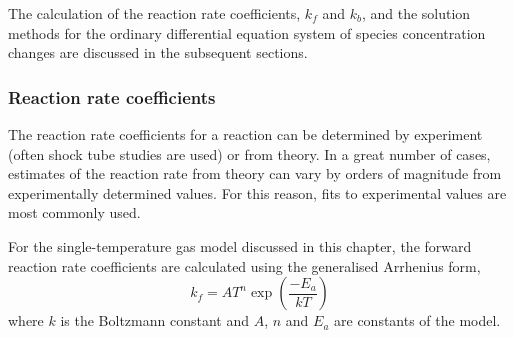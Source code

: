 \medskip
The calculation of the reaction rate coefficients, $k_f$ and $k_b$, and the solution methods for the ordinary differential
equation system of species concentration changes are discussed in the subsequent sections.

\subsubsection{Reaction rate coefficients}
%
The reaction rate coefficients for a reaction can be determined by experiment (often
shock tube studies are used) or from theory.
In a great number of cases, estimates of the reaction rate from theory can vary by
orders of magnitude from experimentally determined values.
For this reason, fits to experimental values are most commonly used.

For the single-temperature gas model discussed in this chapter,
the forward reaction rate coefficients are calculated using
the generalised Arrhenius form,
\begin{equation}
\label{eqn:ga}
k_f = A T^{n} \exp{\left( \frac{-E_a}{kT}\right)}
\end{equation}
where $k$ is the Boltzmann constant and $A$, $n$ and $E_a$ are constants
of the model.

